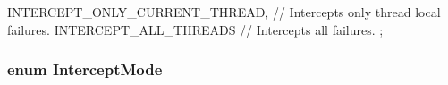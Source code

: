 \begin{DoxyCode}
                     {
    INTERCEPT_ONLY_CURRENT_THREAD,  // Intercepts only thread local failures.
    INTERCEPT_ALL_THREADS           // Intercepts all failures.
  };
\end{DoxyCode}
\hypertarget{classtesting_1_1ScopedFakeTestPartResultReporter_a1d75549697022f869ab9d184916077d2}{
\subsubsection[{\-Intercept\-Mode}]{\setlength{\rightskip}{0pt plus 5cm}enum {\bf \-Intercept\-Mode}}}\label{df/d0c/classtesting_1_1ScopedFakeTestPartResultReporter_a1d75549697022f869ab9d184916077d2}
